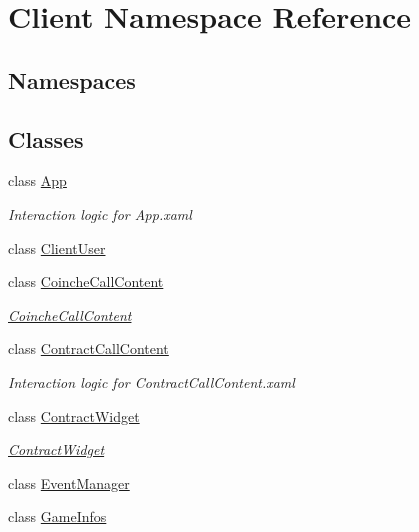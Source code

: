 \hypertarget{namespace_client}{}\section{Client Namespace Reference}
\label{namespace_client}
\subsection*{Namespaces}
\begin{DoxyCompactItemize}
\end{DoxyCompactItemize}
\subsection*{Classes}
\begin{DoxyCompactItemize}
\item 
class \hyperlink{class_client_1_1_app}{App}
\begin{DoxyCompactList}\small\item\em Interaction logic for App.\+xaml \end{DoxyCompactList}\item 
class \hyperlink{class_client_1_1_client_user}{Client\+User}
\item 
class \hyperlink{class_client_1_1_coinche_call_content}{Coinche\+Call\+Content}
\begin{DoxyCompactList}\small\item\em \hyperlink{class_client_1_1_coinche_call_content}{Coinche\+Call\+Content} \end{DoxyCompactList}\item 
class \hyperlink{class_client_1_1_contract_call_content}{Contract\+Call\+Content}
\begin{DoxyCompactList}\small\item\em Interaction logic for Contract\+Call\+Content.\+xaml \end{DoxyCompactList}\item 
class \hyperlink{class_client_1_1_contract_widget}{Contract\+Widget}
\begin{DoxyCompactList}\small\item\em \hyperlink{class_client_1_1_contract_widget}{Contract\+Widget} \end{DoxyCompactList}\item 
class \hyperlink{class_client_1_1_event_manager}{Event\+Manager}
\item 
class \hyperlink{class_client_1_1_game_infos}{Game\+Infos}
\item 

\end{DoxyCompactItemize}
